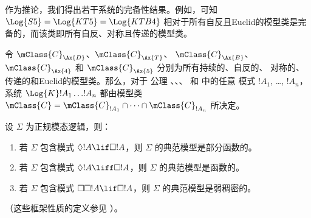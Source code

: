\documentclass[../../../include/open-logic-section]{subfiles}
\begin{document}
作为推论，我们得出若干系统的完备性结果。例如，可知 $\Log{S5} = \Log{KT5} =
\Log{KTB4}$ 相对于所有自反且Euclid的模型类是完备的，而该类即所有自反、对称且传递的模型类。

\begin{thm}
  令 $\mClass{C}_{\Ax{D}}$、$\mClass{C}_{\Ax{T}}$、
  $\mClass{C}_{\Ax{B}}$、$\mClass{C}_{\Ax{4}}$ 和
  $\mClass{C}_{\Ax{5}}$ 分别为所有持续的、自反的、
  对称的、传递的和Euclid的模型类。那么，对于
  公理 、、、 和  中的任意
  模式 $!A_1$, \dots, $!A_n$，系统
  $\Log{K}!A_1 \dots !A_n$ 都由模型类
  $\mClass{C} = \mClass{C}_{!A_1} \cap \dots
  \cap \mClass{C}_{!A_n}$ 所决定。
\end{thm}

\begin{prop}
  设 $\Sigma$ 为正规模态逻辑，则：
  \begin{enumerate}
  \item{}%
    若 $\Sigma$ 包含模式 $\Diamond!A \lif \Box
    !A$，则 $\Sigma$ 的典范模型是部分函数的。
  \item 若 $\Sigma$ 包含模式 $\Diamond!A \liff \Box
    !A$，则 $\Sigma$ 的典范模型是函数的。
  \item 若 $\Sigma$ 包含模式 $\Box\Box!A \lif \Box
    !A$，则 $\Sigma$ 的典范模型是弱稠密的。
  \end{enumerate}
（这些框架性质的定义参见 ）。
\end{prop}
\end{document}

